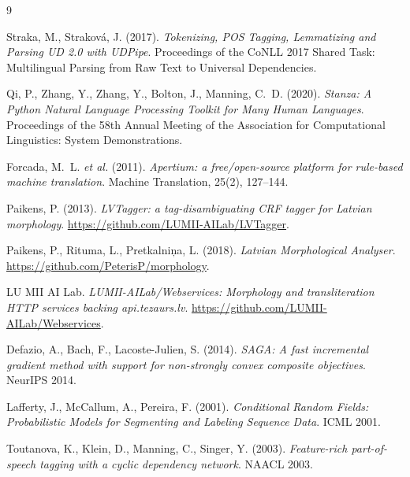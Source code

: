\documentclass[11pt,a4paper]{article}
\begin{document}
\begin{thebibliography}{9}

Straka, M., Straková, J. (2017).
\textit{Tokenizing, POS Tagging, Lemmatizing and Parsing UD 2.0 with UDPipe}.
Proceedings of the CoNLL 2017 Shared Task: Multilingual Parsing from Raw Text to Universal Dependencies.

Qi, P., Zhang, Y., Zhang, Y., Bolton, J., Manning, C.~D. (2020).
\textit{Stanza: A Python Natural Language Processing Toolkit for Many Human Languages}.
Proceedings of the 58th Annual Meeting of the Association for Computational Linguistics: System Demonstrations.

Forcada, M.~L. \emph{et al.} (2011).
\textit{Apertium: a free/open-source platform for rule-based machine translation}.
Machine Translation, 25(2), 127--144.

Paikens, P. (2013).
\textit{LVTagger: a tag-disambiguating CRF tagger for Latvian morphology}.
\url{https://github.com/LUMII-AILab/LVTagger}.

Paikens, P., Rituma, L., Pretkalniņa, L. (2018).
\textit{Latvian Morphological Analyser}.
\url{https://github.com/PeterisP/morphology}.

LU MII AI Lab.
\textit{LUMII-AILab/Webservices: Morphology and transliteration HTTP
services backing api.tezaurs.lv}.
\url{https://github.com/LUMII-AILab/Webservices}.

Defazio, A., Bach, F., Lacoste-Julien, S. (2014).
\textit{SAGA: A fast incremental gradient method with support for non-strongly
convex composite objectives}.
NeurIPS 2014.

Lafferty, J., McCallum, A., Pereira, F. (2001).
\textit{Conditional Random Fields: Probabilistic Models for Segmenting and
Labeling Sequence Data}.
ICML 2001.

Toutanova, K., Klein, D., Manning, C., Singer, Y. (2003).
\textit{Feature-rich part-of-speech tagging with a cyclic dependency network}.
NAACL 2003.

\end{thebibliography}
\end{document}
